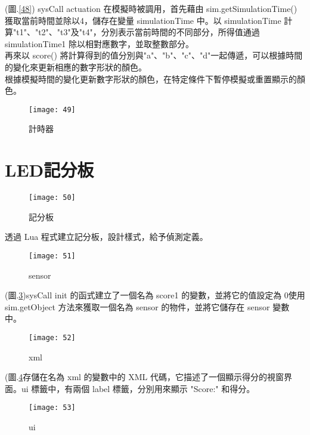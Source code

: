 (圖.\ref{48}) sysCall actuation 在模擬時被調用，首先藉由 sim.getSimulationTime() 獲取當前時間並除以4，儲存在變量 simulationTime 中。以 simulationTime 計算"t1"、"t2"、"t3"及"t4"，分別表示當前時間的不同部分，所得值通過 simulationTime1 除以相對應數字，並取整數部分。\\
再來以 score() 將計算得到的值分別與"a"、"b"、"c"、"d"一起傳遞，可以根據時間的變化來更新相應的數字形狀的顏色。\\
  根據模擬時間的變化更新數字形狀的顏色，在特定條件下暫停模擬或重置顯示的顏色。\\
\begin{figure}[hbt!]
\begin{center}
\texttt{[image: 49]}
\caption{\Large 計時器}\label{fig.49}
\end{center}
\end{figure}
\newpage
\section{LED記分板}
\begin{figure}[hbt!]
\begin{center}
\texttt{[image: 50]}
\caption{\Large 記分板}\label{50}
\end{center}
\end{figure}
透過 Lua 程式建立記分板，設計樣式，給予偵測定義。\\
\newpage
\begin{figure}[hbt!]
\begin{center}
\texttt{[image: 51]}
\caption{\Large sensor}\label{51}
\end{center}
\end{figure}

(圖.\ref{51})sysCall init 的函式建立了一個名為 score1 的變數，並將它的值設定為 0使用 sim.getObject 方法來獲取一個名為 sensor 的物件，並將它儲存在 sensor 變數中。\\
\begin{figure}[hbt!]
\begin{center}
\texttt{[image: 52]}
\caption{\Large xml}\label{52}
\end{center}
\end{figure}

(圖.\ref{52}存儲在名為 xml 的變數中的 XML 代碼，它描述了一個顯示得分的視窗界面。ui 標籤中，有兩個 label 標籤，分別用來顯示 "Score:" 和得分。\\
\begin{figure}[hbt!]
\begin{center}
\texttt{[image: 53]}
\caption{\Large ui}\label{53}
\end{center}
\end{figure}

